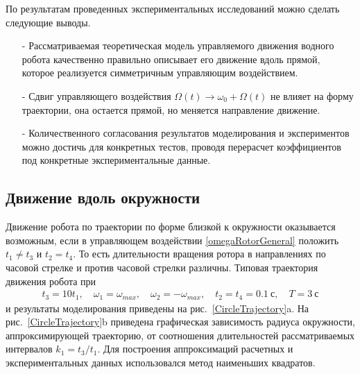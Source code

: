 
По результатам проведенных экспериментальных исследований можно сделать следующие выводы.
\begin{itemize}
	\item[-] Рассматриваемая теоретическая модель управляемого движения водного робота качественно правильно  описывает его движение вдоль прямой, которое реализуется симметричным управляющим воздействием.
	
	\item[-] Сдвиг управляющего воздействия $\Omega(t) \rightarrow \omega_0 + \Omega(t)$ не влияет на форму траектории, она остается прямой, но меняется направление движение.
	
	\item[-] Количественного согласования результатов моделирования и экспериментов можно достичь для конкретных тестов, проводя перерасчет коэффициентов под конкретные экспериментальные данные.
\end{itemize}



\subsection{Движение вдоль окружности}

Движение робота по траектории по форме близкой к окружности оказывается возможным, если в управляющем воздействии \eqref{omegaRotorGeneral} положить $t_1 \neq t_3$ и $t_2 = t_4$. То есть длительности вращения ротора в направлениях по часовой стрелке и против часовой стрелки различны. Типовая траектория движения робота при
\begin{gather}
t_3 = 10 t_1,\quad \omega_1 = \omega_{max},\quad \omega_2 = -\omega_{max},\quad t_2 = t_4 = 0.1~\text{с},\quad T = 3~\text{с}
\end{gather}
и результаты моделирования приведены на рис.~\ref{CircleTrajectory}a. На рис.~\ref{CircleTrajectory}b приведена графическая зависимость радиуса окружности, аппроксимирующей траекторию, от соотношения длительностей рассматриваемых интервалов $k_1 = t_3 / t_1$. Для построения аппроксимаций расчетных и экспериментальных данных использовался метод наименьших квадратов.

